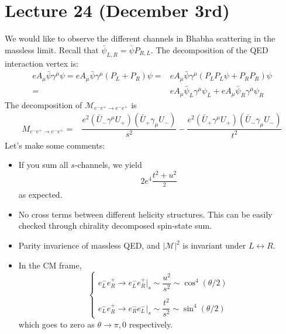 \section{Lecture 24 (December 3rd)}
\begin{cor}
We would like to observe the different channels in Bhabha scattering in the massless limit. Recall that $\bar{\psi }_{L,R}=\bar{\psi }P_{R,L}$. The decomposition of the QED interaction vertex is:
\[\begin{align*}
eA_{\mu }\bar{\psi }\gamma ^{\mu }\psi =eA_{\mu }\bar{\psi }\gamma ^{\mu }(P_{L}+P_{R})\psi =&eA_{\mu }\bar{\psi }\gamma ^{\mu }(P_{L}P_{L}\psi +P_{R}P_{R})\psi\\ =&eA_{\mu }\bar{\psi }_{L}\gamma ^{\mu }\psi _{L}+eA_{\mu }\bar{\psi }_{R}\gamma ^{\mu }\psi _{R}
\end{align*}\]
The decomposition of $\mathcal{M}_{e^{-}e^{+}\rightarrow e^{-}e^{+}}$ is 
\[\begin{align*}
M_{e^{-}e^{+}\rightarrow e^{-}e^{+}}=&\dfrac{e^2(\bar{U}_{-}\gamma ^{\mu }U_{+})(\bar{U}_{+}\gamma _{\mu }U_{-})}{s^2}-\dfrac{e^2(\bar{U}_{+}\gamma ^{\mu }U_{+})(\bar{U}_{-}\gamma _{\mu }U_{-})}{t^2}
\end{align*}\]
Let's make some comments:
\begin{itemize}
\item[(i)] If you sum all $s$-channels, we yield 
\[2e^{4}\dfrac{t^2+u^2}{^2}\]
as expected.
\item[(ii)] No cross terms between different helicity structures. This can be easily checked through chirality decomposed spin-state sum.
\item[(iii)] Parity invarience of massless QED, and $|\mathcal{M}|^2$ is invariant under $L\leftrightarrow R$. 
\item[(iv)] In the CM frame,
\[\begin{cases}
e_{L}^{-}e_{R}^{+}\rightarrow e_{L}^{-}e_{R}^{+}\big|_{s}\sim \dfrac{u^2}{s^2}\sim \cos ^{4}(\theta /2)\\\\
e_{L}^{-}e_{R}^{+}\rightarrow e^{-}_{R}e_{L}^{-}\big|_{s}\sim \dfrac{t^2}{s^2}\sim \sin ^{4}(\theta /2)
\end{cases}\]
which goes to zero as $\theta \rightarrow \pi ,0$ respectively.
\end{itemize}
\end{cor}
\vspace{2ex}

